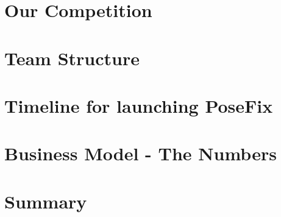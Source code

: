 \documentclass[a4paper, 11pt]{report}
\begin{document}
	{
		\FloatBarrier
		\chapter{Our Competition}
		\label{chp:competition}
		
	}

	{
		\FloatBarrier
		\chapter{Team Structure}
		\label{chp:team_structure}
		
	}

	{
		\FloatBarrier
		\chapter{Timeline for launching PoseFix}
		\label{chp:timeline}
		
	}

	{
		\FloatBarrier
		\chapter{Business Model - The Numbers}
		\label{chp:business_model}
		
	}

	{
		\FloatBarrier
		\chapter{Summary}
		\label{chp:summary}
		
	}

	{
		\FloatBarrier
		\newpage
		\printbibliography[title = References]
	}
\end{document}
